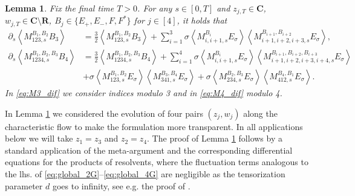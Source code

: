 \documentclass[10pt]{amsart}
\newtheorem{lemma}[theorem]{Lemma}
\numberwithin{equation}{section}
\newcommand{\R}{\mathbf{R}}
\newcommand{\C}{\mathbf{C}}
\begin{document}
\begin{lemma}\label{lem:M_dif} Fix the final time $T>0$. For any $s\in [0,T]$ and $z_{j,T}\in\C$, $w_{j,T}\in\C\setminus\R$, $B_j\in\{E_+,E_-,F,F^*\}$ for $j\in[4]$, it holds that
\begin{align}
\partial_s \left\langle M_{123,s}^{B_1,B_2}B_3\right\rangle &= \frac{3}{2} \left\langle M_{123,s}^{B_1,B_2}B_3\right\rangle + \sum_{i=1}^3\sigma \left\langle M_{i,i+1,s}^{B_i}E_\sigma \right\rangle \left\langle M_{i+1,i+2,i+3,s}^{B_{i+1},B_{i+2}}E_\sigma\right\rangle,\label{eq:M3_dif}\\
\partial_s \left\langle M_{1234,s}^{B_1,B_2,B_3}B_4\right\rangle &= \frac{3}{2} \left\langle M_{1234,s}^{B_1,B_2,B_3}B_4\right\rangle + \sum_{i=1}^4\sigma \left\langle M_{i,i+1,s}^{B_i}E_\sigma \right\rangle \left\langle M_{i+1,i+2,i+3,i+4,s}^{B_{i+1},B_{i+2},B_{i+3}}E_\sigma\right\rangle\label{eq:M4_dif}\\
&+\sigma \left\langle M_{123,s}^{B_1,B_2}E_\sigma\right\rangle \left\langle M_{341,s}^{B_3,B_4}E_\sigma\right\rangle + \sigma \left\langle M_{234,s}^{B_2,B_3}E_\sigma\right\rangle \left\langle M_{412,s}^{B_4,B_1}E_\sigma\right\rangle.\nonumber
\end{align}
In \eqref{eq:M3_dif} we consider indices modulo 3 and in \eqref{eq:M4_dif} modulo 4.
\end{lemma}


In Lemma \ref{lem:M_dif} we considered the evolution of four pairs $(z_j,w_j)$ along the characteristic flow to make the formulation more transparent. In all applications below we will take $z_1=z_3$ and $z_2=z_4$. The proof of Lemma \ref{lem:M_dif} follows by a standard application of the meta-argument and the corresponding differential equations for the products of resolvents, where the fluctuation terms analogous to the lhs. of \eqref{eq:global_2G}--\eqref{eq:global_4G} are negligible as the tensorization parameter $d$ goes to infinity, see e.g. the proof of \cite[Lemma 4.8]{cipolloni2023eigenstate}.
\end{document}
